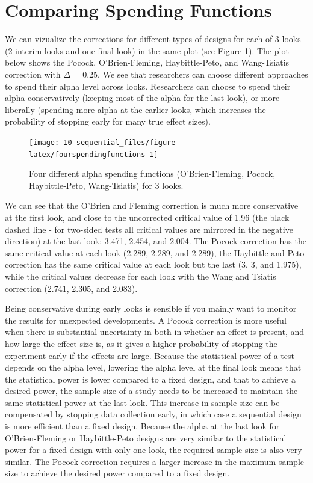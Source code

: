 \documentclass[
  oneside]{book}
\begin{document}
\hypertarget{comparing-spending-functions}{%
\section{Comparing Spending Functions}\label{comparing-spending-functions}}

We can vizualize the corrections for different types of designs for each of 3 looks (2 interim looks and one final look) in the same plot (see Figure \ref{fig:fourspendingfunctions}). The plot below shows the Pocock, O'Brien-Fleming, Haybittle-Peto, and Wang-Tsiatis correction with \(\Delta\) = 0.25. We see that researchers can choose different approaches to spend their alpha level across looks. Researchers can choose to spend their alpha conservatively (keeping most of the alpha for the last look), or more liberally (spending more alpha at the earlier looks, which increases the probability of stopping early for many true effect sizes).

\begin{figure}

{\centering \texttt{[image: 10-sequential\_files/figure-latex/fourspendingfunctions-1]} 

}

\caption{Four different alpha spending functions (O'Brien-Fleming, Pocock, Haybittle-Peto, Wang-Tsiatis) for 3 looks.}\label{fig:fourspendingfunctions}
\end{figure}

We can see that the O'Brien and Fleming correction is much more conservative at the first look, and close to the uncorrected critical value of 1.96 (the black dashed line - for two-sided tests all critical values are mirrored in the negative direction) at the last look: 3.471, 2.454, and 2.004. The Pocock correction has the same critical value at each look (2.289, 2.289, and 2.289), the Haybittle and Peto correction has the same critical value at each look but the last (3, 3, and 1.975), while the critical values decrease for each look with the Wang and Tsiatis correction (2.741, 2.305, and 2.083).

Being conservative during early looks is sensible if you mainly want to monitor the results for unexpected developments. A Pocock correction is more useful when there is substantial uncertainty in both in whether an effect is present, and how large the effect size is, as it gives a higher probability of stopping the experiment early if the effects are large. Because the statistical power of a test depends on the alpha level, lowering the alpha level at the final look means that the statistical power is lower compared to a fixed design, and that to achieve a desired power, the sample size of a study needs to be increased to maintain the same statistical power at the last look. This increase in sample size can be compensated by stopping data collection early, in which case a sequential design is more efficient than a fixed design. Because the alpha at the last look for O'Brien-Fleming or Haybittle-Peto designs are very similar to the statistical power for a fixed design with only one look, the required sample size is also very similar. The Pocock correction requires a larger increase in the maximum sample size to achieve the desired power compared to a fixed design.
\end{document}
